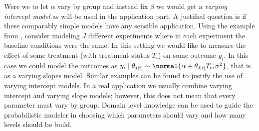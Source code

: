 Were we to let $\alpha$ vary by group and instead fix $\beta$ we would get a \emph{varying intercept model} as will be used in the application part.
A justified question is if these comparably simple models have any sensible application.
Using the example from \citet{GelmanHill2007}, consider modeling $J$ different experiments where in each experiment the baseline conditions were the same.
In this setting we would like to measure the effect of some treatment (with treatment status $T_i$) on some outcome $y_i$.
In this case we could model the outcomes as $y_i \mid \theta_{j[i]} \sim \normal{\alpha + \theta_{j[i]} T_i, \sigma^2}$,
that is as a varying slopes model.
Similar examples can be found to justify the use of varying intercept models.
In a real application we usually combine varying intercept and varying slope models; however,
this does not mean that every parameter must vary by group.
Domain level knowledge can be used to guide the probabilistic modeler in choosing which parameters should vary and how many levels should be build.
